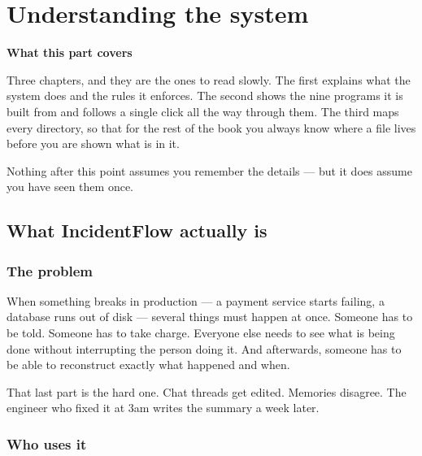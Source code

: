 \part{Understanding the system}

\noindent\textbf{\large What this part covers}

\medskip
\noindent
Three chapters, and they are the ones to read slowly. The first explains what
the system does and the rules it enforces. The second shows the nine programs it
is built from and follows a single click all the way through them. The third
maps every directory, so that for the rest of the book you always know where a
file lives before you are shown what is in it.

\medskip
\noindent
Nothing after this point assumes you remember the details --- but it does assume
you have seen them once.

\chapter{What IncidentFlow actually is}
\label{ch:what}

\section{The problem}

When something breaks in production --- a payment service starts failing, a
database runs out of disk --- several things must happen at once. Someone has to
be told. Someone has to take charge. Everyone else needs to see what is being
done without interrupting the person doing it. And afterwards, someone has to be
able to reconstruct exactly what happened and when.

That last part is the hard one. Chat threads get edited. Memories disagree. The
engineer who fixed it at 3am writes the summary a week later.


\section{Who uses it}

